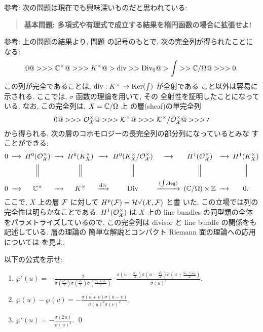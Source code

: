 \documentclass[12pt,twoside]{jarticle}
\def\O{\cal{O}}
\def\pe{\wp}
\def\Div{{\text{\rm Div}}}
\def\deg{{\text{\rm deg}}}
\def\Z{{\Bbb Z}} %
\def\C{{\Bbb C}} %
\def\Ker{\mathop{\text{\rm Ker}}\nolimits}   %
\def\div{\mathop{\text{\rm div}}\nolimits}
\begin{document}
\medskip

\noindent 参考: 次の問題は現在でも興味深いものだと思われている:
\begin{quote}
  {\bf\large
    基本問題: 多項式や有理式で成立する結果を楕円函数の場合に拡張せよ!
  }
\end{quote}

\medskip

\noindent 参考: 上の問題の結果より, 問題  の記号のもとで, 
次の完全列が得られたことになる:
\[
  0
  @>>> \C^{\times}
  @>>> K^{\times}
  @>{\div}>> \Div_0
  @>{\int}>> \C/\Omega
  @>>> 0.
\] %
この列が完全であることは, $\div:K^{\times}\to\Ker(\int)$ が全射である
こと以外は容易に示される. ここでは, $\sigma$ 函数の理論を用いて, その
全射性を証明したことになっている. なお, この完全列は, $X=\C/\Omega$ 上
の層(sheaf)の単完全列
\[
  0 
  @>>> \O_X^{\times} 
  @>>> K^{\times} 
  @>>> K^{\times}/\O_X^{\times}
  @>>> 0
\]
から得られる, 次の層のコホモロジーの長完全列の部分列になっているとみな
すことができる:
\[
\minCDarrowwidth 0.5cm
\begin{CD}
  0
  @>>> H^0(\O_X^{\times})
  @>>> H^0(K_X^{\times} )
  @>>> H^0(K_X^{\times}/\O_X^{\times})
  @>>> H^1(\O_X^{\times})
  @>>> H^1(K_X^{\times} )
  \\
  @.
  @|
  @|
  @|
  @|
  @|
  \\
  0
  @>>> \C^{\times}
  @>>> K^{\times}
  @>{\div}>> \Div
  @>{(\int,\deg)}>> (\C/\Omega)\times \Z
  @>>> 0.
\end{CD}
\] %
ここで, $X$ 上の層 $\cal F$ に対して $H^p(\cal F)=H^p(X,\cal F)$ と書
いた. この立場では列の完全性は明らかなことである. $H^1(\O_X^{\times})$ %
は $X$ 上の line bundles の同型類の全体をパラメトライズしているので, 
この完全列は divisor と line bundle の関係をも記述している. 層の理論の
簡単な解説とコンパクト Riemann 面の理論への応用については \cite{Gun} 
を見よ.

\begin{question}\label{q:pe-sigma1}\qstar{*}
  以下の公式を示せ:
  \begin{enumerate}
  \item \(\displaystyle
    \pe'(u)
    = -
    \frac{2}{
      \sigma(\frac{\omega_1}{2})
      \sigma(\frac{\omega_2}{2})
      \sigma(\frac{\omega_1+\omega_2}{2})
      }
    \cdot
    \frac{
      \sigma\left( u - \frac{\omega_1}{2} \right)
      \sigma\left( u - \frac{\omega_2}{2} \right)
      \sigma\left( u + \frac{\omega_1+\omega_2}{2} \right)
      }{\sigma(u)^3}    
    \).
  \item \(\displaystyle
      \pe(u) - \pe(v)
      = - \frac{\sigma(u+v)\sigma(u-v)}{\sigma(u)^2\sigma(v)^2}
    \).
  \item \(\displaystyle
      \pe'(u)
      = - \frac{\sigma(2u)}{\sigma(u)^4}
    \). \qed
  \end{enumerate}
\end{question}
\end{document}
